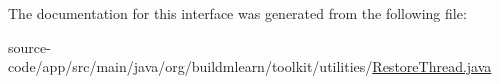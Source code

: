 The documentation for this interface was generated from the following file\+:\begin{DoxyCompactItemize}
\item 
source-\/code/app/src/main/java/org/buildmlearn/toolkit/utilities/\hyperlink{RestoreThread_8java}{Restore\+Thread.\+java}\end{DoxyCompactItemize}
